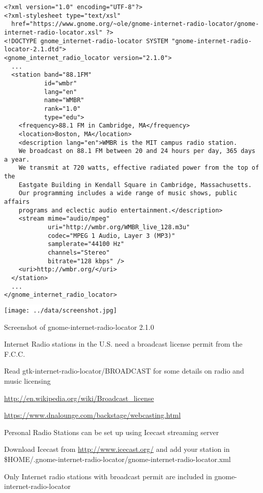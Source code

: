 \documentclass[20pt,landscape]{foils}
\begin{document}
\begin{tiny}
\begin{verbatim}
<?xml version="1.0" encoding="UTF-8"?>
<?xml-stylesheet type="text/xsl"
  href="https://www.gnome.org/~ole/gnome-internet-radio-locator/gnome-internet-radio-locator.xsl" ?>
<!DOCTYPE gnome_internet-radio-locator SYSTEM "gnome-internet-radio-locator-2.1.dtd">
<gnome_internet_radio_locator version="2.1.0">
  ...
  <station band="88.1FM"
           id="wmbr"
           lang="en"
           name="WMBR"
           rank="1.0"
           type="edu">
    <frequency>88.1 FM in Cambridge, MA</frequency>
    <location>Boston, MA</location>
    <description lang="en">WMBR is the MIT campus radio station.
    We broadcast on 88.1 FM between 20 and 24 hours per day, 365 days a year.
    We transmit at 720 watts, effective radiated power from the top of the
    Eastgate Building in Kendall Square in Cambridge, Massachusetts.
    Our programming includes a wide range of music shows, public affairs
    programs and eclectic audio entertainment.</description>
    <stream mime="audio/mpeg"
            uri="http://wmbr.org/WMBR_live_128.m3u"
            codec="MPEG 1 Audio, Layer 3 (MP3)"
            samplerate="44100 Hz"
            channels="Stereo"
            bitrate="128 kbps" />
    <uri>http://wmbr.org/</uri>
  </station>
  ...
</gnome_internet_radio_locator>
\end{verbatim}
\end{tiny}


\begin{center}

  \colorbox{white}{\texttt{[image: ../data/screenshot.jpg]}}

  {\blueem Screenshot of gnome-internet-radio-locator 2.1.0}

\end{center}


\begin{list1}
  \item Internet Radio stations in the U.S. need a broadcast license permit from the F.C.C.
    \begin{list2}
    \item Read gtk-internet-radio-locator/BROADCAST for some details on radio and music licensing
    \item \url{http://en.wikipedia.org/wiki/Broadcast_license}
    \item \url{https://www.dnalounge.com/backstage/webcasting.html}
    \end{list2}
  \item Personal Radio Stations can be set up using Icecast streaming server
    \begin{list2}
    \item Download Icecast from \url{http://www.icecast.org/} and add your station in \$HOME/.gnome-internet-radio-locator/gnome-internet-radio-locator.xml
    \end{list2}
  \item Only Internet radio stations with broadcast permit are included in gnome-internet-radio-locator
\end{list1}
\end{document}
